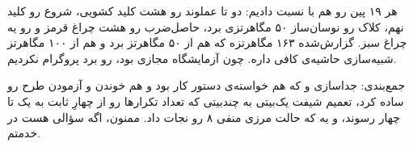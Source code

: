 \documentclass[12pt,a4paper]{article}
\begin{document}
هر ۱۹ پین رو هم با  نسبت دادیم: دو تا عملوند رو هشت کلید کشویی، شروع رو کلید نهم، کلاک رو نوسان‌ساز ۵۰ مگاهرتزی برد، حاصل‌ضرب رو هشت چراغ قرمز و  رو یه چراغ سبز.  گزارش‌شده ۱۶۳ مگاهرتزه که هم از ۵۰ مگاهرتز برد و هم از ۱۰۰ مگاهرتز شبیه‌سازی حاشیه‌ی کافی داره. چون آزمایشگاه مجازی بود، رو برد پروگرام نکردیم.

جمع‌بندی: جداسازی  و  که هم خواسته‌ی دستور کار بود و هم خوندن و آزمودن طرح رو ساده کرد، تعمیم شیفت یک‌بیتی به چندبیتی که تعداد تکرارها رو از چهارِ ثابت به یک تا چهار رسوند، و یه  که حالت مرزی منفی ۸ رو نجات داد. ممنون، اگه سؤالی هست در خدمتم.
\end{document}
